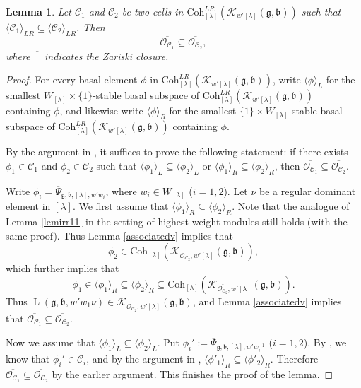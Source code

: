 \documentclass[12pt,a4paper]{amsart}
\def\subset{\subseteq}
\newcommand{\CC}{{\mathcal {C}}}
\newcommand{\CK}{{\mathcal {K}}}
\newcommand{\CO}{{\mathcal {O}}}
\newcommand{\oL}{\operatorname{L}}
\newcommand{\g}{\mathfrak g}
\renewcommand{\b}{\mathfrak b}
\newcommand{\la}{\langle}
\newcommand{\ra}{\rangle}
\numberwithin{equation}{section}
\newtheorem{lem}[thm]{Lemma}
\theoremstyle{remark}
\def\Coh{\mathrm{Coh}}
\newcommand{\Lam}{{[\lambda]}}
\begin{document}
\begin{lem}\label{lemlr0}
Let $\CC_1$ and $\CC_2$ be two cells in  $\Coh^{LR}_{\Lam}( \CK_{ w'\Lam}(\g,\b))$ such that  $\la \CC_1\ra_{LR}\subset \la \CC_2\ra_{LR}$. Then
  \[
    \overline{\CO_{\CC_1}}\subseteq   \overline{\CO_{\CC_2}},
  \]
  where $\overline{\phantom A}$ indicates the Zariski closure.
\end{lem}
  \begin{proof}
  For every basal element $\phi$ in  $\Coh^{LR}_{\Lam}( \CK_{ w'\Lam}(\g,\b))$, write $\la \phi\ra_L$ for the smallest $W_\Lam\times \{1\}$-stable basal subspace of $\Coh^{LR}_{\Lam}( \CK_{ w'\Lam}(\g,\b))$ containing $\phi$, and likewise write $\la \phi\ra_R$ for the smallest $\{1\}\times W_\Lam$-stable basal subspace of $\Coh^{LR}_{\Lam}( \CK_{ w'\Lam}(\g,\b))$ containing $\phi$.

  By the argument in \cite[Section 3]{BVUni}, it suffices to prove the following statement:
   if there exists $\phi_1\in \CC_1$ and $\phi_2\in \CC_2$ such that $\la \phi_1\ra_L\subset \la \phi_2\ra_L$ or $\la \phi_1\ra_R\subset \la \phi_2\ra_R$, then $ \overline{\CO_{\CC_1}}\subset   \overline{\CO_{\CC_2}}$.

 Write $\phi_i= \overline \Psi_{\g,\b, \Lam, w'w_i}$, where $w_i\in W_\Lam$ ($i=1,2$). Let $\nu$ be a regular dominant element in $\Lam$.
 We first assume that  $\la \phi_1\ra_R\subset \la \phi_2\ra_R$. Note that the analogue of Lemma \ref{lemirr11} in the setting of highest weight modules still holds (with the same proof). Thus
Lemma \ref{associatedv} implies that
\[
  \phi_2\in  \Coh_{\Lam}( \CK_{\overline{\CO_{\CC_2}},  w'\Lam}(\g,\b)),
\]
which further implies that
\[
 \phi_1\in  \la \phi_1\ra_R\subset \la \phi_2\ra_R\subset  \Coh_{\Lam}( \CK_{\overline{\CO_{\CC_2}},  w'\Lam}(\g,\b)).
\]
Thus $\oL(\g,\b, w'w_1\nu)\in \CK_{\overline{\CO_{\CC_2}},  w'\Lam}(\g,\b)$, and Lemma  \ref{associatedv} implies that $ \overline{\CO_{\CC_1}}\subset   \overline{\CO_{\CC_2}}$.

Now we assume that $\la \phi_1\ra_L\subset \la \phi_2\ra_L$. Put
$\phi_i':= \overline \Psi_{\g,\b, \Lam, w'w_i^{-1}}$ ($i=1,2$). By \cite[Lemma
5.2]{Lu}, we know that $\phi_i'\in \CC_i$, and by the argument in \cite[Section
3]{BVUni}, $\la \phi'_1\ra_R\subset \la \phi'_2\ra_R$. Therefore
$\overline{\CO_{\CC_1}}\subset \overline{\CO_{\CC_2}}$ by the earlier argument.
This finishes the proof of the lemma.
\end{proof}
\end{document}
